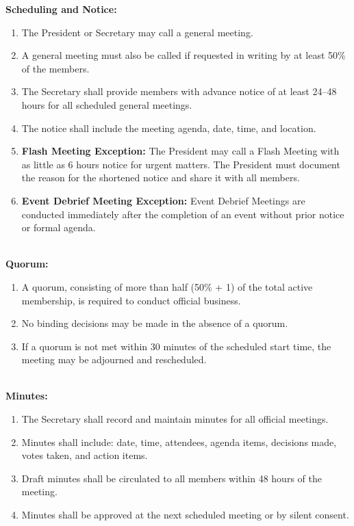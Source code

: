 \textbf{Scheduling and Notice:}
\begin{enumerate}[label=\alph*), leftmargin=2em, itemsep=0.3em]
    \item The President or Secretary may call a general meeting.
    \item A general meeting must also be called if requested in writing by at least 50\% of the members.
    \item The Secretary shall provide members with advance notice of at least 24--48 hours for all scheduled general meetings.
    \item The notice shall include the meeting agenda, date, time, and location.
    \item \textbf{Flash Meeting Exception:} The President may call a Flash Meeting with as little as 6 hours notice for urgent matters. The President must document the reason for the shortened notice and share it with all members.
    \item \textbf{Event Debrief Meeting Exception:} Event Debrief Meetings are conducted immediately after the completion of an event without prior notice or formal agenda.
\end{enumerate}
\\
\textbf{Quorum:}
\begin{enumerate}[label=\alph*), leftmargin=2em, itemsep=0.3em]
    \item A quorum, consisting of more than half (50\% + 1) of the total active membership, is required to conduct official business.
    \item No binding decisions may be made in the absence of a quorum.
    \item If a quorum is not met within 30 minutes of the scheduled start time, the meeting may be adjourned and rescheduled.
\end{enumerate}
\\
\textbf{Minutes:}
\begin{enumerate}[label=\alph*), leftmargin=2em, itemsep=0.3em]
    \item The Secretary shall record and maintain minutes for all official meetings.
    \item Minutes shall include: date, time, attendees, agenda items, decisions made, votes taken, and action items.
    \item Draft minutes shall be circulated to all members within 48 hours of the meeting.
    \item Minutes shall be approved at the next scheduled meeting or by silent consent.
\end{enumerate}
